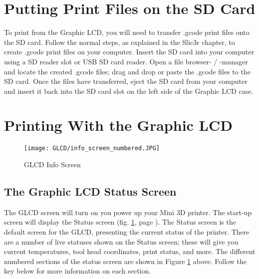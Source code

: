\section{Putting Print Files on the SD Card}
To print from the Graphic LCD, you will need to transfer .gcode print files onto the SD card. Follow the normal steps, as explained in the Slic3r chapter, to create .gcode print files on your computer. Insert the SD card into your computer using a SD reader slot or USB SD card reader. Open a file browser- / -manager and locate the created .gcode files; drag and drop or paste the .gcode files to the SD card. Once the files have transferred, eject the SD card from your computer and insert it back into the SD card slot on the left side of the Graphic LCD case.

\section{Printing With the Graphic LCD}
\begin{figure}[b]
\centering
\texttt{[image: GLCD/info\_screen\_numbered.JPG]}
\caption{GLCD Info Screen}
\label{fig:info_screen}
\end{figure}

\subsection{The Graphic LCD Status Screen}
The GLCD screen will turn on you power up your Mini 3D printer. The start-up screen will display the Status screen (fig. \ref{fig:info_screen}, page \pageref{fig:info_screen}). The Status screen is the default screen for the GLCD, presenting the current status of the printer. There are a number of live statuses shown on the Status screen; these will give you current temperatures, tool head coordinates, print status, and more. The different numbered sections of the status screen are shown in Figure \ref{fig:info_screen} above. Follow the key below for more information on each section.


